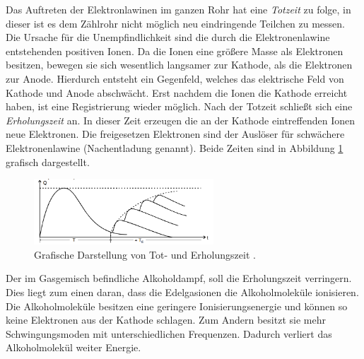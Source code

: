 Das Auftreten der Elektronlawinen im ganzen Rohr hat eine \emph{Totzeit} zu folge, %
in dieser ist es dem Zählrohr nicht möglich neu eindringende Teilchen %
zu messen. Die Ursache für die Unempfindlichkeit sind die durch die Elektronenlawine
entstehenden positiven Ionen.
Da die Ionen eine größere Masse als Elektronen besitzen,
bewegen sie sich wesentlich langsamer zur Kathode, als die Elektronen
zur Anode. Hierdurch entsteht ein Gegenfeld, welches das
elektrische Feld von Kathode und Anode abschwächt.
Erst nachdem die Ionen die Kathode erreicht haben, ist eine
Registrierung wieder möglich. Nach der Totzeit schließt sich
eine \emph{Erholungszeit} an. In dieser Zeit erzeugen
die an der Kathode eintreffenden Ionen neue Elektronen.
Die freigesetzen Elektronen sind der Auslöser für schwächere Elektronenlawine (Nachentladung genannt).
Beide Zeiten sind %
in Abbildung \ref{fig: tot_und_erholungszeit} grafisch dargestellt.
\begin{figure}
  \centering
  \includegraphics[width=0.6\textwidth]{bilder/totzeit.png}
  \caption{Grafische Darstellung von Tot- und Erholungszeit \cite{anleitung703}.}
  \label{fig: tot_und_erholungszeit}
  \end{figure}

Der im Gasgemisch befindliche Alkoholdampf, soll die Erholungszeit verringern. Dies liegt zum einen
daran, dass die Edelgasionen die Alkoholmoleküle ionisieren. Die Alkoholmoleküle %
besitzen eine geringere Ionisierungsenergie und können so keine Elektronen aus
der Kathode schlagen. Zum Andern besitzt sie mehr Schwingungsmoden %
mit unterschiedlichen Frequenzen. %
Dadurch verliert das Alkoholmolekül %
weiter Energie. %

